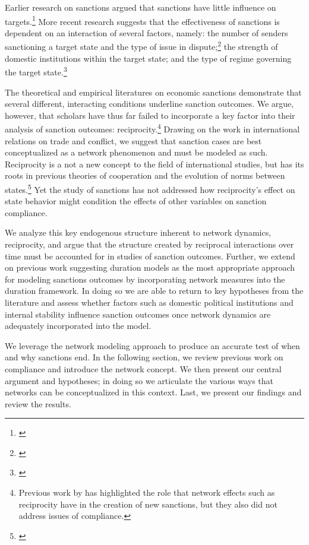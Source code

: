 Earlier research on sanctions argued that sanctions have little influence on targets.\footnote{\cite{lam1990, dashti1997, morgan1997, drezner1998}} More recent research suggests that the effectiveness of sanctions is dependent on an interaction of several factors, namely: the number of senders sanctioning a target state and the type of issue in dispute;\footnote{\cite{miers2002, morgan2009threat}} the strength of domestic institutions within the target state; and the type of regime governing the target state.\footnote{\cite{mcgillivray2004}} 

The theoretical and empirical literatures on economic sanctions demonstrate that several different, interacting conditions underline sanction outcomes. We argue, however, that scholars have thus far failed to incorporate a key factor into their analysis of sanction outcomes: reciprocity.\footnote{Previous work by \cite{cranmer2014reciprocity} has highlighted the role that network effects such as reciprocity have in the creation of new sanctions, but they also did not address issues of compliance.} Drawing on the work in international relations on trade and conflict, we suggest that sanction cases are best conceptualized as a network phenomenon and must be modeled as such. Reciprocity is a not a new concept to the field of international studies, but has its roots in previous theories of cooperation and the evolution of norms between states.\footnote{\cite{richardsonai:1960,choucri:north:1972,goldstein1991reciprocity,rajmaira1990evolving,ward1992reciprocity}} Yet the study of sanctions has not addressed how reciprocity's effect on state behavior might condition the effects of other variables on sanction compliance. 

We analyze this key endogenous structure inherent to network dynamics, reciprocity, and argue that the structure created by reciprocal interactions over time must be accounted for in studies of sanction outcomes. Further, we extend on previous work suggesting duration models as the most appropriate approach for modeling sanctions outcomes by incorporating network measures into the duration framework. In doing so we are able to return to key hypotheses from the literature and assess whether factors such as domestic political institutions and internal stability influence sanction outcomes once network dynamics are adequately incorporated into the model. 

We leverage the network modeling approach to produce an accurate test of when and why sanctions end. In the following section, we review previous work on compliance and introduce the network concept. We then present our central argument and hypotheses; in doing so we articulate the various ways that networks can be conceptualized in this context. Last, we present our findings and review the results.

